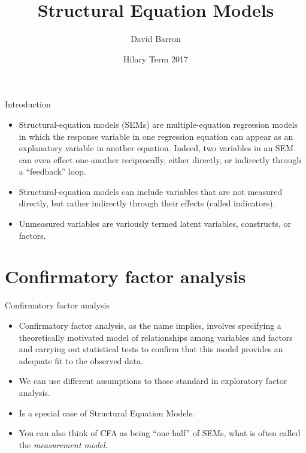 \documentclass[10pt,ignorenonframetext,]{beamer}
\title{Structural Equation Models}
\author{David Barron}
\date{Hilary Term 2017}
\providecommand{\tightlist}{%
\setlength{\itemsep}{0pt}\setlength{\parskip}{0pt}}
\begin{document}
\frame{\titlepage}

\begin{frame}{Introduction}

\begin{itemize}
\tightlist
\item
  Structural-equation models (SEMs) are multiple-equation regression
  models in which the response variable in one regression equation can
  appear as an explanatory variable in another equation. Indeed, two
  variables in an SEM can even effect one-another reciprocally, either
  directly, or indirectly through a ``feedback'' loop.
\item
  Structural-equation models can include variables that are not measured
  directly, but rather indirectly through their effects (called
  indicators).
\item
  Unmeasured variables are variously termed latent variables,
  constructs, or factors.
\end{itemize}

\end{frame}

\section{Confirmatory factor
analysis}\label{confirmatory-factor-analysis}

\begin{frame}{Confirmatory factor analysis}

\begin{itemize}
\tightlist
\item
  Confirmatory factor analysis, as the name implies, involves specifying
  a theoretically motivated model of relationships among variables and
  factors and carrying out statistical tests to confirm that this model
  provides an adequate fit to the observed data.
\item
  We can use different assumptions to those standard in exploratory
  factor analysis.
\item
  Is a special case of Structural Equation Models.\\
\item
  You can also think of CFA as being ``one half'' of SEMs, what is often
  called the \emph{measurement model}.
\end{itemize}

\end{frame}
\end{document}
